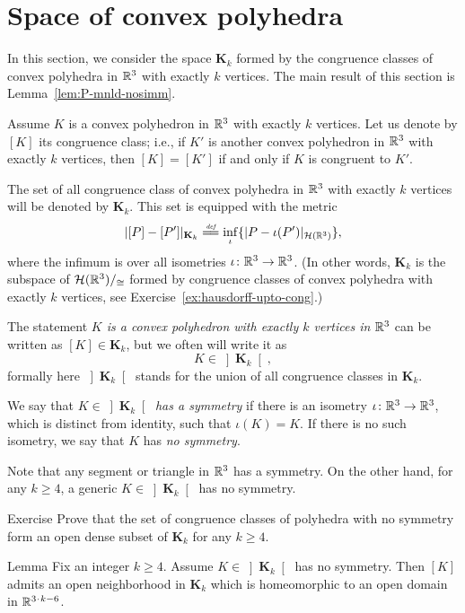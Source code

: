 \section{Space of convex polyhedra}\label{sec:polhedra}

In this section, we consider the space $\mathbf{K}_k$
formed by the congruence classes of
convex polyhedra in $\mathbb{R}^3$ with exactly $k$ vertices.
The main result of this section is Lemma~\ref{lem:P-mnld-nosimm}.

Assume $K$ is a convex polyhedron in $\mathbb{R}^3$ with exactly $k$ vertices.
Let us denote by $[K]$ its congruence class;
i.e., if $K'$ is another convex polyhedron in $\mathbb{R}^3$ with exactly $k$ vertices, then $[K]=[K']$ if and only if $K$ is congruent to $K'$.

The set of all congruence class of convex polyhedra in $\mathbb{R}^3$ with exactly $k$ vertices 
will be denoted by $\mathbf{K}_k$.
This set is equipped with the metric
$$|[P]-[P']|_{\mathbf{K}_k}
\df
\inf_{\iota}\{|P-\iota(P')|_{\mathcal{H}(\RR^3)}\},$$
where the infimum is over all isometries $\iota\colon\mathbb{R}^3\to\mathbb{R}^3$.
(In other words, $\mathbf{K}_k$ is the subspace of $\mathcal{H}(\mathbb{R}^3)/_{\cong}$ formed by congruence classes of convex polyhedra with exactly $k$ vertices,
see Exercise~\ref{ex:hausdorff-upto-cong}.)

The statement \emph{$K$ is a convex polyhedron with exactly $k$ vertices in $\mathbb{R}^3$} can be written as $[K]\in \mathbf{K}_k$, 
but we often will write it as $$K\in\left]\mathbf{K}_k\right[,$$ formally here $\left]\mathbf{K}_k\right[$ stands for the union of all congruence classes in $\mathbf{K}_k$.

We say that $K\in\left]\mathbf{K}_k\right[$ \emph{has a symmetry} if there is an isometry $\iota\colon\mathbb{R}^3\to\mathbb{R}^3$, which is distinct from identity,
such that $\iota(K)=K$.
If there is no such isometry, we say that  $K$ has \emph{no symmetry}.

Note that any segment or triangle in $\mathbb{R}^3$ has a symmetry.
On the other hand, for any $k\ge 4$,
a generic $K\in\left]\mathbf{K}_k\right[$ 
has no symmetry.

\begin{thm}{Exercise}\label{ex:nosym-K}
Prove that the set of congruence classes of polyhedra with no symmetry form an open dense subset of $\mathbf{K}_k$ for any $k\ge 4$.
\end{thm}


\begin{thm}{Lemma}\label{lem:P-mnld-nosimm}
Fix an integer $k\ge 4$.
Assume $K\in\left]\mathbf{K}_k\right[$ has no symmetry.
Then $[K]$ admits 
an open neighborhood in $\mathbf{K}_k$ 
which is homeomorphic 
to an open domain in $\RR^{3\cdot k-6}$.
\end{thm}

